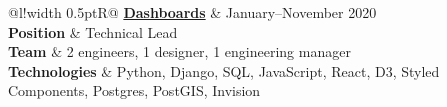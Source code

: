 \documentclass[]{article}
\newcommand\VRule{\color{lightgray}\vrule width 0.5pt}
\begin{document}

\begin{tabular}{@{}l!{\VRule}R@{}}
	{\bf \href{https://www.quorum.us/solutions/reporting/}{Dashboards}} & {\footnotesize January--November 2020}\\
	\textbf{Position} &  Technical Lead\\
	\textbf{Team} & 2 engineers, 1 designer, 1 engineering manager\\
	\textbf{Technologies} & Python, Django, SQL, JavaScript, React, D3, Styled Components, Postgres, PostGIS, Invision\\
\end{tabular}
\end{document}
